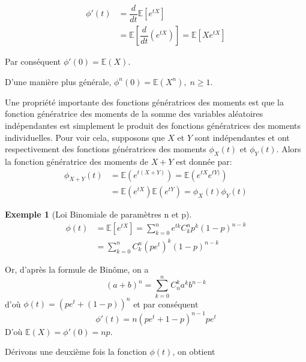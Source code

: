 \documentclass[
]{book}
\theoremstyle{definition}
\theoremstyle{definition}
\newtheorem{example}{Exemple}[chapter]
\theoremstyle{definition}
\theoremstyle{remark}
\begin{document}
\begin{align*}
\phi'(t)&=\dfrac{d}{dt}\mathbb{E}\left[e^{tX} \right] \\
&=\mathbb{E}\left[\dfrac{d}{dt}(e^{tX}) \right]=\mathbb{E}\left[Xe^{tX} \right]
\end{align*}

Par conséquent \(\phi'(0)= \mathbb{E}(X)\).

D'une manière plus générale, \(\phi^n(0)=\mathbb{E}\left( {X}^n\right),\; n \geq 1\).

Une propriété importante des fonctions génératrices des moments est que la fonction génératrice des moments de la somme des variables aléatoires indépendantes est simplement le produit des fonctions génératrices des moments individuelles. Pour voir cela, supposons que \(X\) et \(Y\) sont indépendantes et ont respectivement des fonctions génératrices des moments \(\phi_X(t)\) et \(\phi_Y(t)\). Alors la fonction génératrice des moments de \(X+Y\) est donnée par:
\begin{align*}
\phi_{X+Y}(t)&=\mathbb{E}\left(e^{t(X+Y)} \right)=\mathbb{E}\left(e^{tX}e^{tY)} \right)\\
&=\mathbb{E}\left(e^{tX}\right) \mathbb{E}\left(e^{tY}\right)=\phi_X(t)\phi_Y(t)
\end{align*}

\begin{example}[Loi Binomiale de paramètres n et p]
\protect\hypertarget{exm:unnamed-chunk-14}{}{\label{exm:unnamed-chunk-14} {} }\begin{align*}
\phi(t)&=\mathbb{E}\left[e^{tX} \right]=\sum_{k=0}^ne^{tk}C^n_kp^k{(1-p)}^{n-k}\\
&=\sum_{k=0}^nC^n_k{\left(pe^t\right)}^k{(1-p)}^{n-k}
\end{align*}
\end{example}

Or, d'après la formule de Binôme, on a
\[
{(a+b)}^n=\sum_{k=0}^nC_n^ka^kb^{n-k}
\]
d'où \(\phi(t)={\left( pe^t+(1-p)\right)}^n\) et par conséquent
\[
\phi'(t)=n{\left(pe^t+1-p \right)}^{n-1}pe^t
\]
D'où \(\mathbb{E}(X)=\phi'(0)=np\).

Dérivons une deuxième fois la fonction \(\phi(t)\), on obtient
\end{document}
